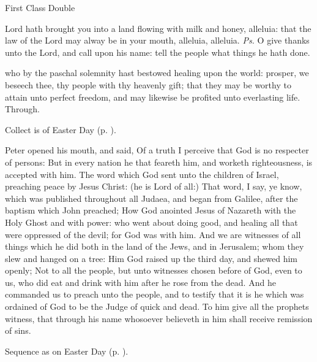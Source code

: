 \begin{inhead}
    {First Class Double}
\end{inhead}

\properantiphonfix

\introit
{} Lord hath brought you into a land flowing with milk and honey, alleluia: that the law of the Lord may alway be in your mouth, alleluia, alleluia. \textit{Ps.} O give thanks unto the Lord, and call upon his name: tell the people what things he hath done.

\collect
 who by the paschal solemnity hast bestowed healing upon the world: prosper, we beseech thee, thy people with thy heavenly gift; that they may be worthy to attain unto perfect freedom, and may likewise be profited unto everlasting life. Through.
\begin{rubric}
     Collect is of Easter Day (p. \pageref{EasterCollect}).
\end{rubric}

 Peter opened his mouth, and said, Of a truth I perceive that God is no respecter of persons: But in every nation he that feareth him, and worketh righteousness, is accepted with him. The word which God sent unto the children of Israel, preaching peace by Jesus Christ: (he is Lord of all:) That word, I say, ye know, which was published throughout all Judaea, and began from Galilee, after the baptism which John preached; How God anointed Jesus of Nazareth with the Holy Ghost and with power: who went about doing good, and healing all that were oppressed of the devil; for God was with him. And we are witnesses of all things which he did both in the land of the Jews, and in Jerusalem; whom they slew and hanged on a tree: Him God raised up the third day, and shewed him openly; Not to all the people, but unto witnesses chosen before of God, even to us, who did eat and drink with him after he rose from the dead. And he commanded us to preach unto the people, and to testify that it is he which was ordained of God to be the Judge of quick and dead. To him give all the prophets witness, that through his name whosoever believeth in him shall receive remission of sins.

\begin{rubric}
    Sequence as on Easter Day (p. \pageref{PaschalSequence}).
\end{rubric}

